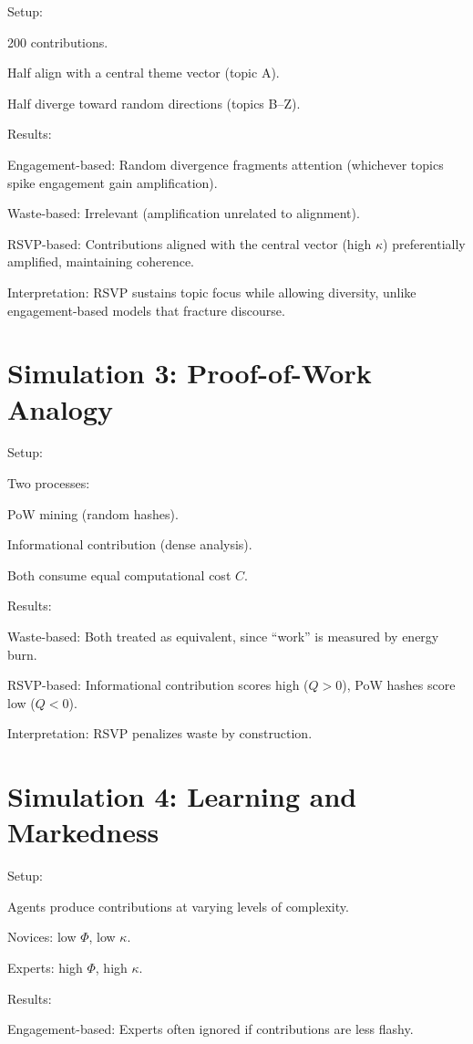 \documentclass{book}
\begin{document}
Setup:

200 contributions.

Half align with a central theme vector (topic A).

Half diverge toward random directions (topics B–Z).

Results:

Engagement-based: Random divergence fragments attention (whichever topics spike engagement gain amplification).

Waste-based: Irrelevant (amplification unrelated to alignment).

RSVP-based: Contributions aligned with the central vector (high \( \kappa \)) preferentially amplified, maintaining coherence.

Interpretation: RSVP sustains topic focus while allowing diversity, unlike engagement-based models that fracture discourse.

\section{Simulation 3: Proof-of-Work Analogy}

Setup:

Two processes: 

PoW mining (random hashes).

Informational contribution (dense analysis).

Both consume equal computational cost \( C \).

Results:

Waste-based: Both treated as equivalent, since ``work'' is measured by energy burn.

RSVP-based: Informational contribution scores high (\( Q > 0 \)), PoW hashes score low (\( Q < 0 \)).

Interpretation: RSVP penalizes waste by construction.

\section{Simulation 4: Learning and Markedness}

Setup:

Agents produce contributions at varying levels of complexity.

Novices: low \( \Phi \), low \( \kappa \).

Experts: high \( \Phi \), high \( \kappa \).

Results:

Engagement-based: Experts often ignored if contributions are less flashy.
\end{document}
